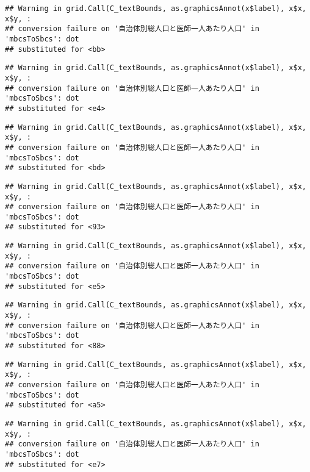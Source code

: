 \documentclass[
]{article}
\begin{document}
\begin{verbatim}
## Warning in grid.Call(C_textBounds, as.graphicsAnnot(x$label), x$x, x$y, :
## conversion failure on '自治体別総人口と医師一人あたり人口' in 'mbcsToSbcs': dot
## substituted for <bb>
\end{verbatim}

\begin{verbatim}
## Warning in grid.Call(C_textBounds, as.graphicsAnnot(x$label), x$x, x$y, :
## conversion failure on '自治体別総人口と医師一人あたり人口' in 'mbcsToSbcs': dot
## substituted for <e4>
\end{verbatim}

\begin{verbatim}
## Warning in grid.Call(C_textBounds, as.graphicsAnnot(x$label), x$x, x$y, :
## conversion failure on '自治体別総人口と医師一人あたり人口' in 'mbcsToSbcs': dot
## substituted for <bd>
\end{verbatim}

\begin{verbatim}
## Warning in grid.Call(C_textBounds, as.graphicsAnnot(x$label), x$x, x$y, :
## conversion failure on '自治体別総人口と医師一人あたり人口' in 'mbcsToSbcs': dot
## substituted for <93>
\end{verbatim}

\begin{verbatim}
## Warning in grid.Call(C_textBounds, as.graphicsAnnot(x$label), x$x, x$y, :
## conversion failure on '自治体別総人口と医師一人あたり人口' in 'mbcsToSbcs': dot
## substituted for <e5>
\end{verbatim}

\begin{verbatim}
## Warning in grid.Call(C_textBounds, as.graphicsAnnot(x$label), x$x, x$y, :
## conversion failure on '自治体別総人口と医師一人あたり人口' in 'mbcsToSbcs': dot
## substituted for <88>
\end{verbatim}

\begin{verbatim}
## Warning in grid.Call(C_textBounds, as.graphicsAnnot(x$label), x$x, x$y, :
## conversion failure on '自治体別総人口と医師一人あたり人口' in 'mbcsToSbcs': dot
## substituted for <a5>
\end{verbatim}

\begin{verbatim}
## Warning in grid.Call(C_textBounds, as.graphicsAnnot(x$label), x$x, x$y, :
## conversion failure on '自治体別総人口と医師一人あたり人口' in 'mbcsToSbcs': dot
## substituted for <e7>
\end{verbatim}
\end{document}

